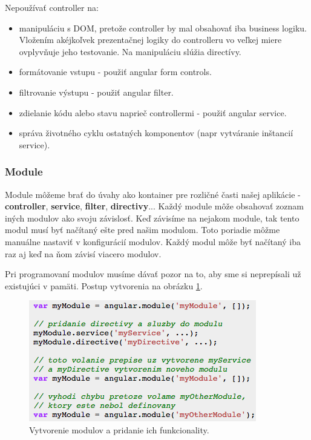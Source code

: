 \noindent Nepoužívať controller na:
\begin{itemize}
\item manipuláciu s DOM, pretože controller by mal obsahovať iba business logiku. Vložením akéjkoľvek prezentačnej logiky do controlleru vo veľkej miere ovplyvňuje jeho testovanie. Na manipuláciu slúžia directívy.
\item formátovanie vstupu - použiť angular form controls.
\item filtrovanie výstupu - použiť angular filter.
\item zdielanie kódu alebo stavu naprieč controllermi - použiť angular service.
\item správa životného cyklu ostatných komponentov (napr vytváranie inštancií service).
\end{itemize}


\subsubsection{Module}
Module môžeme brať do úvahy ako kontainer pre rozličné časti našej aplikácie - \textbf{controller}, \textbf{service}, \textbf{filter}, \textbf{directivy}... Každý module môže obsahovať zoznam iných modulov ako svoju závislosť. Keď závisíme na nejakom module, tak tento modul musí byť načítaný ešte pred našim modulom. Toto poriadie môžme manuálne nastaviť v konfigurácií modulov. Každý modul môže byť načítaný iba raz aj keď na ňom závisí viacero modulov.\cite{angular-docs}

Pri programovaní modulov musíme dávať pozor na to, aby sme si neprepísali už existujúci v pamäti. Postup vytvorenia na obrázku \ref{img-angular-module-def}.

\begin{figure}[H]
  \centering
  \includegraphics[scale=0.8]{img/code/angular-module.png}
  \caption{Vytvorenie modulov a pridanie ich funkcionality.}
  \label{img-angular-module-def}
\end{figure}

